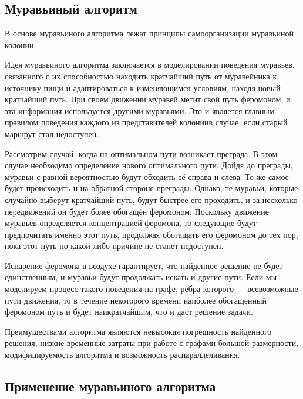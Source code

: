 \documentclass[a4paper,14pt]{report}
\begin{document}
\subsection*{Муравьиный алгоритм}

В основе муравьиного алгоритма лежат принципы самоорганизации муравьиной колонии.

Идея   муравьиного   алгоритма   заключается в   моделировании поведения  муравьев,  связанного  с  их  способностью  находить  кратчайший путь от муравейника к источнику пищи и адаптироваться к изменяющимся условиям,  находя  новый  кратчайший  путь.  При  своем  движении  муравей метит  свой  путь  феромоном,  и  эта  информация  используется  другими муравьями.  Это  и  является  главным  правилом  поведения  каждого  из представителей  колониив  случае,  если  старый  маршрут  стал  недоступен.

Рассмотрим  случай, когда  на  оптимальном пути возникает преграда. В этом случае необходимо определение нового оптимального пути. Дойдя до преграды, муравьи с равной вероятностью будут обходить её справа и слева.  То же самое будет происходить и на обратной стороне преграды. Однако, те муравьи, которые случайно выберут кратчайший путь,  будут быстрее его проходить,  и за несколько передвижений он будет более  обогащён  феромоном.   Поскольку  движение  муравьёв  определяется концентрацией феромона, то следующие будут предпочитать именно этот путь, продолжая обогащать его феромоном до тех пор, пока этот путь по какой-либо причине не станет недоступен.

Испарение феромона в воздухе гарантирует, что найденное решение не будет единственным, и муравьи будут продолжать искать и другие пути. Если мы моделируем  процесс  такого  поведения  на  графе,  ребра  которого — всевозможные  пути  движения,  то  в  течение  некоторого  времени  наиболее обогащенный феромоном путь и будет наикратчайшим, что и даст решение задачи.

Преимуществами   алгоритма   являются   невысокая   погрешность найденного  решения,  низкие  временные  затраты  при  работе  с  графами большой  размерности,  модифицируемость  алгоритма  и  возможность распараллеливания.

\subsection*{Применение муравьиного алгоритма}
\end{document}
